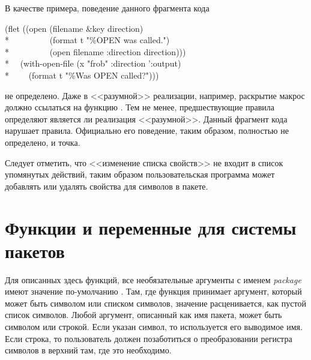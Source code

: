 \begin{newer}
В качестве примера, поведение данного фрагмента кода
\begin{lisp}
(flet ((open (filename \&key direction) \\*
~~~~~~~~~(format t "{\Xtilde}\%OPEN was called.")  \\*
~~~~~~~~~(open filename :direction direction))) \\*
~~(with-open-file (x "frob" :direction ':output)  \\*
~~~~(format t "{\Xtilde}\%Was OPEN called?")))
\end{lisp}
не определено. Даже в <<разумной>> реализации, например, раскрытие макрос
 должно ссылаться на функцию . Тем не менее,
предшествующие правила определяют является ли реализация <<разумной>>.
Данный фрагмент кода нарушает правила. Официально его поведение, таким образом,
полностью не определено, и точка.

Следует отметить, что <<изменение списка свойств>> не входит в список упомянутых
действий, таким образом пользовательская программа может добавлять или удалять
свойства для символов в  пакете.
\end{newer}

\section{Функции и переменные для системы пакетов}
\label{PACKAGE-FUNCTIONS-SECTION}

Для описанных здесь функций, все необязательные аргументы с именем
\emph{package} имеют значение по-умолчанию . Там, где функция
принимает аргумент, который может быть символом или списком символов, значение
{\false} расценивается, как пустой список символов. Любой аргумент, описанный
как имя пакета, может быть символом или строкой.
Если указан символ, то используется его выводимое имя. Если строка, то
пользователь должен позаботиться о преобразовании регистра символов в верхний
там, где это необходимо.

